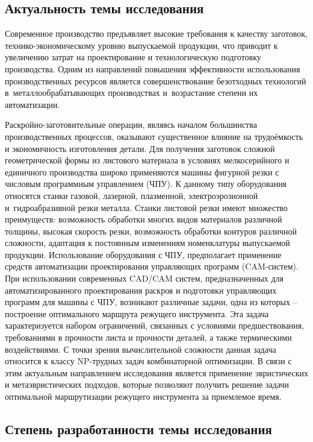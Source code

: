 \documentclass[14pt]{extarticle}
\theoremstyle{plain}%
\theoremstyle{remark}
\begin{document}
\subsection*{Актуальность темы исследования}

Современное производство предъявляет высокие требования к качеству
заготовок, технико-экономическому уровню выпускаемой продукции, что
приводит к увеличению затрат на проектирование и технологическую подготовку
производства. Одним из направлений повышения эффективности использования
производственных ресурсов является совершенствование безотходных технологий
в~металлообрабатывающих производствах и~возрастание степени их автоматизации.

Раскройно-заготовительные операции,
являясь началом большинства производственных процессов,
оказывают существенное влияние на трудоёмкость
и экономичность изготовления детали.
Для получения заготовок сложной
геометрической формы из листового материала в условиях мелкосерийного и
единичного производства широко применяются машины фигурной резки с
числовым программным управлением
(ЧПУ).
К данному типу оборудования
относятся станки газовой, лазерной, плазменной, электроэрозионной
и~гидроабразивной резки металла. Станки листовой резки имеют множество
преимуществ: возможность обработки многих видов материалов различной
толщины, высокая скорость резки, возможность обработки контуров различной
сложности, адаптация к постоянным изменениям номенклатуры выпускаемой
продукции. Использование оборудования с ЧПУ, предполагает применение
средств автоматизации проектирования управляющих программ
(CAM-систем).
При использовании современных CAD/CAM систем, предназначенных для
автоматизированного проектирования раскроя и подготовки
управляющих программ для машины с
ЧПУ, возникают различные задачи, одна из которых -- построение оптимального
маршрута режущего инструмента.
Эта задача характеризуется набором
ограничений, связанных с условиями предшествования, требованиями в прочности
листа и прочности деталей, а также термическими воздействиями.
С точки зрения
вычислительной сложности данная задача относится к классу NP-трудных задач
комбинаторной оптимизации. В связи с этим актуальным направлением
исследования является применение эвристических и метаэвристических подходов,
которые позволяют получить решение задачи
оптимальной маршрутизации
режущего инструмента
за приемлемое время.

\subsection*{Степень разработанности темы исследования}
\end{document}

